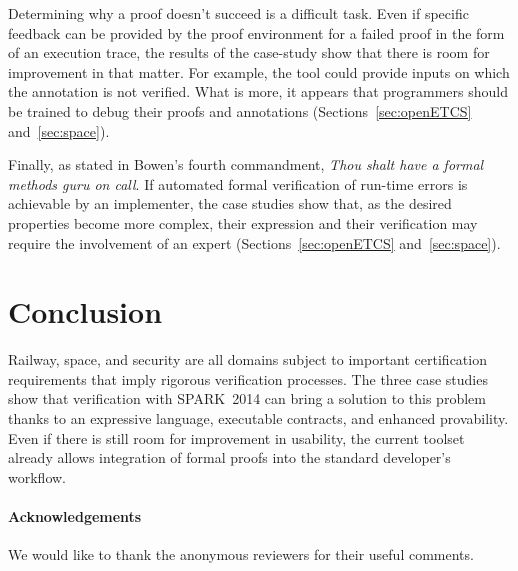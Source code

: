\documentclass[10pt,a4paper,twocolumn]{article}
\newcommand{\newspark}{SPARK~2014\xspace}
\begin{document}
Determining why a proof doesn't succeed is a difficult
task. Even if specific feedback can be provided by the proof
environment for a failed proof in the form of an execution trace, the
results of the case-study show that there is room for improvement in
that matter. For example, the tool could provide inputs on which the
annotation is not verified.  What is more, it appears that programmers
should be trained to debug their proofs and annotations
(Sections~\ref{sec:openETCS} and~\ref{sec:space}).

Finally, as stated in Bowen's fourth commandment, \emph{Thou shalt
  have a formal methods guru on call}. If automated formal
verification of run-time errors is achievable by an implementer, the
case studies show that, as the desired properties become more complex,
their expression and their verification may require the involvement of
an expert (Sections~\ref{sec:openETCS} and~\ref{sec:space}).

\section{Conclusion}

Railway, space, and security are all domains subject to important
certification requirements that imply rigorous verification
processes. The three case studies show that verification with
\newspark can bring a solution to this problem thanks to an expressive
language, executable contracts, and enhanced provability. Even if
there is still room for improvement in usability, the current toolset
already allows integration of formal proofs into the standard
developer's workflow.

\paragraph*{Acknowledgements}

We would like to thank the anonymous reviewers for their useful comments.



\end{document}

